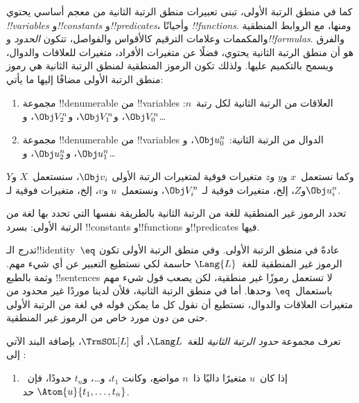 \documentclass[../../../include/open-logic-section]{subfiles}
\begin{document}


كما في منطق الرتبة الأولى، تبنى تعبيرات منطق الرتبة الثانية من معجم
أساسي يحتوي \emph{!!{variable}s} و\emph{!!{constant}s}
و\emph{!!{predicate}s}، وأحيانًا \emph{!!{function}s}. ومنها، مع
الروابط المنطقية والمكممات وعلامات الترقيم كالأقواس والفواصل، تتكون
\emph{الحدود} و\emph{!!{formula}s}. والفرق هو أن منطق الرتبة الثانية
يحتوي، فضلًا عن متغيرات الأفراد، متغيرات للعلاقات والدوال، ويسمح
بالتكميم عليها. ولذلك تكون الرموز المنطقية لمنطق الرتبة الثانية هي رموز
منطق الرتبة الأولى مضافًا إليها ما يأتي:

\begin{enumerate}
\item مجموعة !!{denumerable} من !!{variable}s العلاقات من الرتبة
  الثانية لكل رتبة~$n$: $\Obj V_0^n$، و$\Obj V_1^n$، و$\Obj V_2^n$،
  و\dots
\item مجموعة !!{denumerable} من !!{variable}s الدوال من الرتبة
  الثانية: $\Obj u_0^n$، و$\Obj u_1^n$، و$\Obj u_2^n$، و\dots
\end{enumerate}

وكما نستعمل~$x$ و$y$ و$z$ متغيرات فوقية لمتغيرات الرتبة الأولى
$\Obj v_i$، سنستعمل~$X$ و$Y$ و$Z$، إلخ، متغيرات فوقية لـ
$\Obj V_i^n$، ونستعمل~$u$ و$v$، إلخ، متغيرات فوقية لـ$\Obj u_i^n$.

\begin{explain}
تحدد الرموز غير المنطقية للغة من الرتبة الثانية بالطريقة نفسها التي
تحدد بها لغة من الرتبة الأولى: بسرد !!{constant}s و!!{function}s
و!!{predicate}s فيها.

تدرج الـ!!{identity}~$\eq$ عادةً في منطق الرتبة الأولى. وفي منطق
الرتبة الأولى تكون الرموز غير المنطقية للغة~$\Lang{L}$ حاسمة لكي
نستطيع التعبير عن أي شيء مهم. وثمة بالطبع !!{sentence}s لا تستعمل
رموزًا غير منطقية، لكن يصعب قول شيء مهم باستعمال~$\eq$ وحدها. أما في
منطق الرتبة الثانية، فلأن لدينا موردًا غير محدود من متغيرات العلاقات
والدوال، نستطيع أن نقول كل ما يمكن قوله في لغة من الرتبة الأولى حتى
من دون مورد خاص من الرموز غير المنطقية.
\end{explain}

\begin{defn}
تعرف مجموعة \emph{حدود الرتبة الثانية} للغة~$\Lang L$، أي
$\TrmSOL[L]$، بإضافة البند الآتي إلى
:
\begin{enumerate}
\item إذا كان~$u$ متغيرًا داليًا ذا~$n$ مواضع، وكانت
$t_1$، و\dots، و$t_n$ حدودًا، فإن~$\Atom{u}{t_1, \ldots, t_n}$ حد.
\end{enumerate}
\end{defn}
\end{document}

